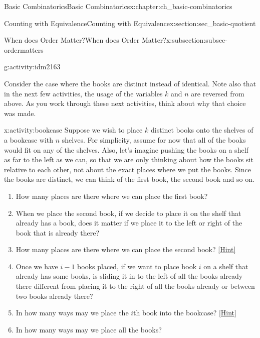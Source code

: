 \documentclass[oneside,10pt,]{book}
\numberwithin{equation}{chapter}
\begin{document}
\begin{chapterptx}{Basic Combinatorics}{}{Basic Combinatorics}{}{}{x:chapter:ch_basic-combinatorics}
\begin{sectionptx}{Counting with Equivalence}{}{Counting with Equivalence}{}{}{x:section:sec_basic-quotient}
\begin{subsectionptx}{When does Order Matter?}{}{When does Order Matter?}{}{}{x:subsection:subsec-ordermatters}
\begin{activity}{}{g:activity:idm2163}
\begin{enumerate}[font=\bfseries,label=(\alph*),ref=\alph*]
\end{enumerate}
\end{activity}
Consider the case where the books are distinct instead of identical.  Note also that in the next few activities, the usage of the variables \(k\) and \(n\) are reversed from above.  As you work through these next activities, think about why that choice was made.%
\begin{activity}{}{x:activity:bookcase}%
Suppose we wish to place \(k\) distinct books onto the shelves of a bookcase with \(n\) shelves. For simplicity, assume for now that all of the books would fit on any of the shelves. Also, let's imagine pushing the books on a shelf as far to the left as we can, so that we are only thinking about how the books sit relative to each other, not about the exact places where we put the books. Since the books are distinct, we can think of the first book, the second book and so on.%
\begin{enumerate}[font=\bfseries,label=(\alph*),ref=\alph*]
\item{}How many places are there where we can place the first book?%
\item{}When we place the second book, if we decide to place it on the shelf that already has a book, does it matter if we place it to the left or right of the book that is already there?%
\item{}How many places are there where we can place the second book?%
\space\hspace*{0pt}\hfill{\tiny\hyperlink{g:hint:idm2202-back}{[Hint]}}\item{}Once we have \(i-1\) books placed, if we want to place book \(i\)  on a shelf that already has some books, is sliding it in to the left of all the books already there different from placing it to the right of all the books already or between two books already there?%
\item{}In how many ways may we place the \(i\)th book into the bookcase?%
\space\hspace*{0pt}\hfill{\tiny\hyperlink{g:hint:idm2218-back}{[Hint]}}\item{}In how many ways may we place all the books?%
\end{enumerate}
\end{activity}

\end{subsectionptx}
\end{sectionptx}
\end{chapterptx}
\end{document}
